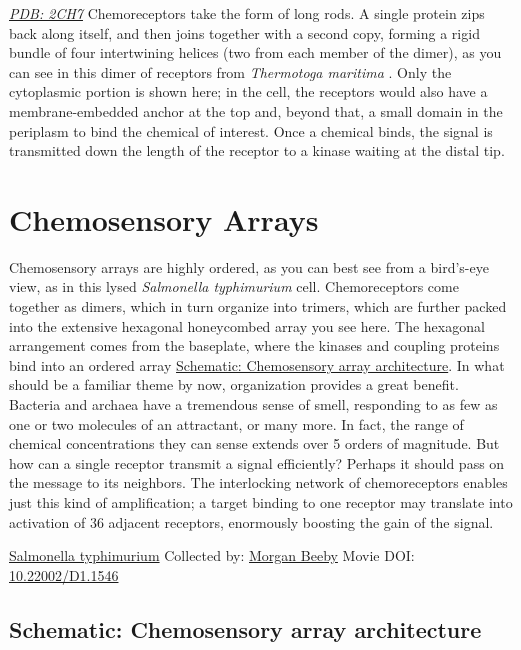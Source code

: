 \documentclass[]{tufte-book}
\begin{document}
\href{http://rcsb.org/structure/2CH7}{\emph{PDB: 2CH7}}
Chemoreceptors take the form of long rods. A single protein zips back along itself, and then joins together with a second copy, forming a rigid bundle of four intertwining helices (two from each member of the dimer), as you can see in this dimer of receptors from \emph{Thermotoga maritima} \citep{park2006}. Only the cytoplasmic portion is shown here; in the cell, the receptors would also have a membrane-embedded anchor at the top and, beyond that, a small domain in the periplasm to bind the chemical of interest. Once a chemical binds, the signal is transmitted down the length of the receptor to a kinase waiting at the distal tip.

\hypertarget{chemosensory-arrays}{%
\section{Chemosensory Arrays}\label{chemosensory-arrays}}

Chemosensory arrays are highly ordered, as you can best see from a bird's-eye view, as in this lysed \emph{Salmonella typhimurium} cell. Chemoreceptors come together as dimers, which in turn organize into trimers, which are further packed into the extensive hexagonal honeycombed array you see here. The hexagonal arrangement comes from the baseplate, where the kinases and coupling proteins bind into an ordered array \protect\hyperlink{Chemosensory_array_architecture}{Schematic: Chemosensory array architecture}. In what should be a familiar theme by now, organization provides a great benefit. Bacteria and archaea have a tremendous sense of smell, responding to as few as one or two molecules of an attractant, or many more. In fact, the range of chemical concentrations they can sense extends over 5 orders of magnitude. But how can a single receptor transmit a signal efficiently? Perhaps it should pass on the message to its neighbors. The interlocking network of chemoreceptors enables just this kind of amplification; a target binding to one receptor may translate into activation of 36 adjacent receptors, enormously boosting the gain of the signal.



\hypertarget{htmlwidget-8ec2d2546b33eb4c0b1d}{}

\label{fig:7-2}\protect\hyperlink{tree}{Salmonella typhimurium} Collected by: \protect\hyperlink{morgan_beeby}{Morgan Beeby} Movie DOI: \href{https://doi.org/10.22002/D1.1546}{10.22002/D1.1546}

\hypertarget{Chemosensory_array_architecture}{%
\subsection*{Schematic: Chemosensory array architecture}\label{Chemosensory_array_architecture}}
\end{document}

